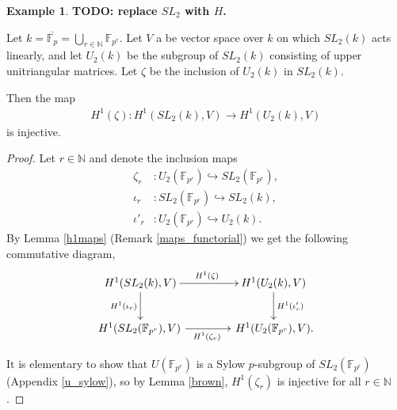 \documentclass[12pt]{amsart}
\numberwithin{equation}{section}
\theoremstyle{definition}
\newtheorem{ex}[equation]{Example}
\theoremstyle{remark}
\theoremstyle{remark}
\begin{document}
\begin{ex} \label{ab_example} \textbf{TODO: replace $SL_2$ with $H$.}

Let $k = \overline{\mathbb{F}_p} = \bigcup_{r\in \mathbb{N}} \mathbb{F}_{p^r}$.
Let $V$ a be vector space over $k$ on which $SL_2(k)$ acts linearly, and let $U_2(k)$ be the subgroup of $SL_2(k)$ consisting of upper unitriangular matrices. Let $\zeta$ be the inclusion of $U_2(k)$ in $SL_2(k)$.

Then the map
	\begin{align}
		H^1(\zeta): H^1(SL_2(k), V) \rightarrow H^1(U_2(k), V)
	\end{align}
	is injective.
\label{eg:sl2ab}
\end{ex}
\begin{proof}
	Let $r \in \mathbb{N}$ and denote the inclusion maps
\begin{align*}
	\zeta_r&:U_2(\mathbb{F}_{p^r}) \hookrightarrow SL_2(\mathbb{F}_{p^r}), \\
	\iota_r&:SL_2(\mathbb{F}_{p^r}) \hookrightarrow SL_2(k), \\
	\iota'_r&:U_2(\mathbb{F}_{p^r}) \hookrightarrow U_2(k).
\end{align*}
By Lemma \ref{h1maps} (Remark \ref{maps_functorial}) we get the following commutative diagram,
\begin{align}\label{eqn:cd}
	\xymatrix@C=40pt{
		H^1(SL_2(k), V) \ar[r]^{H^1(\zeta)} \ar[d]_{H^1(\iota_r)} & H^1(U_2(k), V) \ar[d]^{H^1(\iota'_r)} \\
		H^1(SL_2(\mathbb{F}_{p^r}), V)\, \ar[r]_{H^1(\zeta_r)} &\, H^1(U_2(\mathbb{F}_{p^r}), V).
	}
\end{align}

It is elementary to show that $U(\mathbb{F}_{p^r})$ is a Sylow $p$-subgroup of $SL_2(\mathbb{F}_{p^r})$ (Appendix \ref{u_sylow}), so by Lemma \ref{brown}, $H^1(\zeta_r)$ is injective for all $r \in \mathbb{N}$.


\end{proof}
\end{document}
